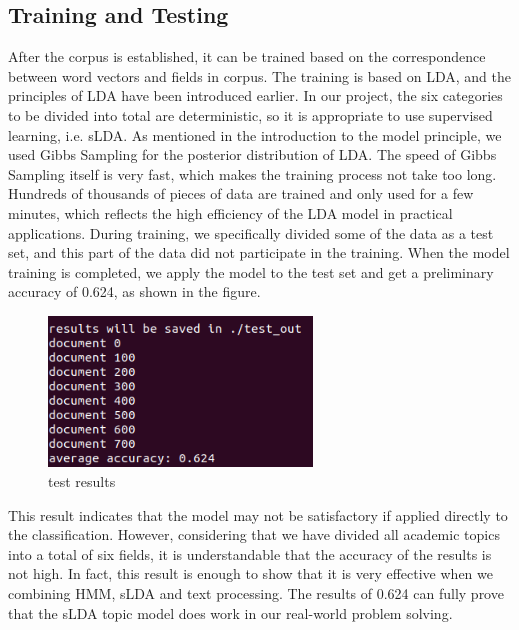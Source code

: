 \documentclass{acmtog} %
\begin{document}
%
\subsection{Training and Testing}
\label{subsec:DynamicCase}
%
After the corpus is established, it can be trained based on the correspondence between word vectors and fields in corpus. The training is based on LDA, and the principles of LDA have been introduced earlier. In our project, the six categories to be divided into total are deterministic, so it is appropriate to use supervised learning, i.e. sLDA.
As mentioned in the introduction to the model principle, we used Gibbs Sampling for the posterior distribution of LDA. The speed of Gibbs Sampling itself is very fast, which makes the training process not take too long. Hundreds of thousands of pieces of data are trained and only used for a few minutes, which reflects the high efficiency of the LDA model in practical applications.
During training, we specifically divided some of the data as a test set, and this part of the data did not participate in the training. When the model training is completed, we apply the model to the test set and get a preliminary accuracy of 0.624, as shown in the figure.

\begin{figure}[h]
\centerline{\includegraphics[width=7cm]{Figure 4.png}}
\caption{test results}
  \label{fig:videocomparison}
\end{figure}

This result indicates that the model may not be satisfactory if applied directly to the classification. However, considering that we have divided all academic topics into a total of six fields, it is understandable that the accuracy of the results is not high. In fact, this result is enough to show that it is very effective when we combining HMM, sLDA and text processing. The results of 0.624 can fully prove that the sLDA topic model does work in our real-world problem solving.

%
\end{document}
